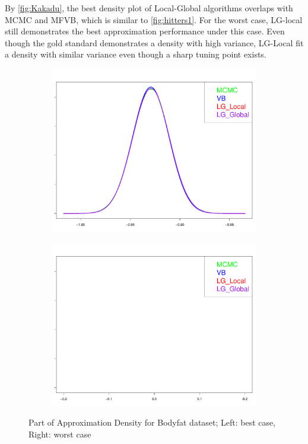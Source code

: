 By \autoref{fig:Kakadu}, the best density plot of Local-Global algorithms overlaps with MCMC and MFVB, which is similar to \autoref{fig:hitters1}. For the worst case, LG-local still demonstrates the best approximation performance under this case. Even though the gold standard demonstrates a density with high variance, LG-Local fit a density with similar variance even though a sharp tuning point exists.\\
\begin{figure}[h]
	\begin{subfigure}{0.5\textwidth}
		\centering
		\includegraphics[page = 1, width=\linewidth,keepaspectratio]{lasso_densities_Bodyfat.pdf}
	\end{subfigure}
	\begin{subfigure}{0.5\textwidth}
		\includegraphics[page = 8, width=\linewidth,keepaspectratio]{lasso_densities_Bodyfat-1.pdf}
	\end{subfigure}
	\caption{Part of Approximation Density for Bodyfat dataset; Left: best case, Right: worst case}
	\label{fig:Bodyfat}
\end{figure}
